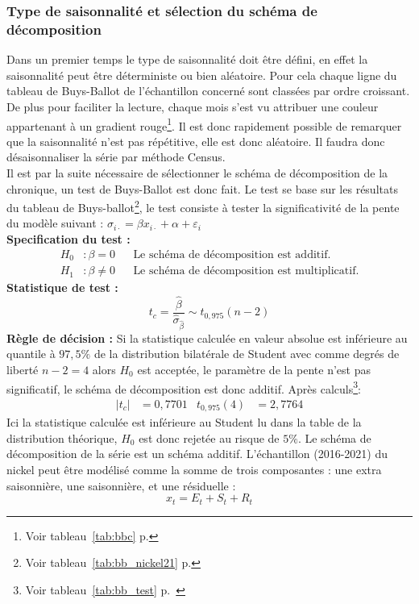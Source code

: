 \subsubsection{Type de saisonnalité et sélection du schéma de décomposition}
Dans un premier temps le type de saisonnalité doit être défini, en effet la saisonnalité peut être déterministe ou bien aléatoire. Pour cela chaque ligne du tableau de 
Buys-Ballot de l'échantillon concerné sont classées par ordre croissant. De plus pour faciliter la lecture, chaque mois s'est vu attribuer une couleur appartenant à
un gradient rouge\footnote{Voir tableau~\ref{tab:bbc} p.\pageref{tab:bbc} }. Il est donc rapidement possible de remarquer que la saisonnalité n'est pas répétitive,
elle est donc aléatoire. Il faudra donc désaisonnaliser la série par méthode Census.\\[11pt] 
Il est par la suite nécessaire de sélectionner le schéma de décomposition de la chronique, un test de Buys-Ballot est donc fait. Le test se base sur les résultats du 
tableau de Buys-ballot\footnote{Voir tableau~\ref{tab:bb_nickel21} p.\pageref{tab:bb_nickel21}}, le test consiste à tester la significativité de la pente du modèle 
suivant : 
$\sigma_{i\cdot} = \beta x_{i\cdot} + \alpha + \varepsilon_{i}$ \\[11pt]
\textbf{Specification du test :
} \begin{align*}
        H_{0} &: \beta = 0 & &\text{Le schéma de décomposition est additif.} \\
        H_{1} &: \beta \neq 0 &  &\text{Le schéma de décomposition est multiplicatif.}
\end{align*}
\textbf{Statistique de test :}
\begin{equation*}
    t_{c} = \frac{\hat{\beta}}{\hat{\sigma}_{\hat{\beta}}}\sim t_{0,975}(n-2)
\end{equation*}
\textbf{Règle de décision : }Si la statistique calculée en valeur absolue est inférieure au quantile à $97,5\%$ de la distribution bilatérale de Student avec comme degrés de liberté $ n-2 = 4$ alors $H_{0}$ est acceptée, le paramètre de la pente n'est pas significatif, le schéma de décomposition est donc additif. 
Après calculs\footnote{Voir tableau~\ref{tab:bb_test} p.~\pageref{tab:bb_test}}:
\begin{align*}
    |t_{c}| &= 0,7701  & t_{0,975}(4) &= 2,7764
\end{align*}
Ici la statistique calculée est inférieure au Student lu dans la table de la distribution théorique, $H_{0}$ est donc rejetée au risque de $5\%$. Le schéma de décomposition
de la série est un schéma additif. L'échantillon (2016-2021) du nickel peut être modélisé comme la somme de trois composantes : une extra saisonnière, une saisonnière, et une résiduelle :
\begin{equation*}
    x_{t} = E_{t} + S_{t} + R_{t}
\end{equation*}

